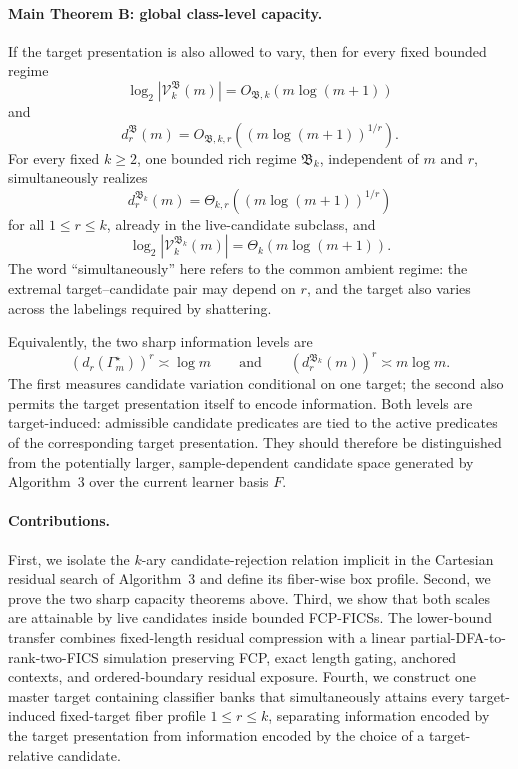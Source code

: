 \documentclass[11pt]{article}
\theoremstyle{definition}
\theoremstyle{remark}
\begin{document}
\paragraph{Main Theorem B: global class-level capacity.}
If the target presentation is also allowed to vary, then for every fixed
bounded regime
\[
\log_2|\mathcal V_k^{\mathfrak B}(m)|
=
O_{\mathfrak B,k}(m\log(m+1))
\]
and
\[
d_r^{\mathfrak B}(m)
=
O_{\mathfrak B,k,r}((m\log(m+1))^{1/r}).
\]
For every fixed \(k\ge2\), one bounded rich regime \(\mathfrak B_k\),
independent of \(m\) and \(r\), simultaneously realizes
\[
\boxed{
d_r^{\mathfrak B_k}(m)
=
\Theta_{k,r}((m\log(m+1))^{1/r})
}
\]
for all \(1\le r\le k\), already in the live-candidate subclass, and
\[
\boxed{
\log_2|\mathcal V_k^{\mathfrak B_k}(m)|
=
\Theta_k(m\log(m+1)).
}
\]
The word ``simultaneously'' here refers to the common ambient regime: the
extremal target--candidate pair may depend on \(r\), and the target also varies
across the labelings required by shattering.

Equivalently, the two sharp information levels are
\[
\boxed{
(d_r(\Gamma_m^\star))^r\asymp\log m
}
\qquad\text{and}\qquad
\boxed{
(d_r^{\mathfrak B_k}(m))^r\asymp m\log m.
}
\]
The first measures candidate variation conditional on one target; the second
also permits the target presentation itself to encode information.  Both
levels are target-induced: admissible candidate predicates are tied to the
active predicates of the corresponding target presentation.  They should
therefore be distinguished from the potentially larger, sample-dependent
candidate space generated by Algorithm~3 over the current learner basis
\(F\).

\paragraph{Contributions.}
First, we isolate the \(k\)-ary candidate-rejection relation implicit in the
Cartesian residual search of Algorithm~3 and define its fiber-wise box
profile.  Second, we prove the two sharp capacity theorems above.  Third, we
show that both scales are attainable by live candidates inside bounded
FCP-FICSs.  The lower-bound transfer combines fixed-length residual compression
with a linear partial-DFA-to-rank-two-FICS simulation preserving FCP, exact
length gating, anchored contexts, and ordered-boundary residual exposure.
Fourth, we construct one master target containing classifier banks that
simultaneously attains every target-induced fixed-target fiber profile
\(1\le r\le k\), separating information encoded by the target presentation
from information encoded by the choice of a target-relative candidate.
\end{document}
